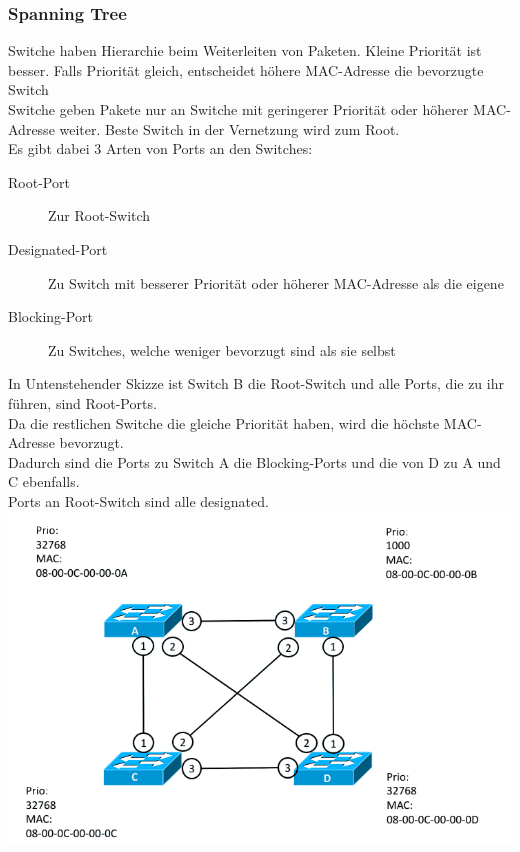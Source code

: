 \documentclass[12pt,a4paper]{article}
\begin{document}
			\subsubsection{Spanning Tree}
				Switche haben Hierarchie beim Weiterleiten von Paketen. Kleine Priorität ist besser. Falls Priorität gleich, entscheidet höhere MAC-Adresse die bevorzugte Switch\\
				Switche geben Pakete nur an Switche mit geringerer Priorität oder höherer MAC-Adresse weiter. Beste Switch in der Vernetzung wird zum Root.\\
				Es gibt dabei 3 Arten von Ports an den Switches:
				\begin{description}
					\item[Root-Port] Zur Root-Switch
					\item[Designated-Port] Zu Switch mit besserer Priorität oder höherer MAC-Adresse als die eigene
					\item[Blocking-Port] Zu Switches, welche weniger bevorzugt sind als sie selbst 
				\end{description}
				In Untenstehender Skizze ist Switch B die Root-Switch und alle Ports, die zu ihr führen, sind Root-Ports.\\
				Da die restlichen Switche die gleiche Priorität haben, wird die höchste MAC-Adresse bevorzugt. \\
				Dadurch sind die Ports zu Switch A die Blocking-Ports und die von D zu A und C ebenfalls. \\
				Ports an Root-Switch sind alle designated.\\
				\includegraphics[width=\textwidth]{Bilder/RouterVermascht.png}
\end{document}
